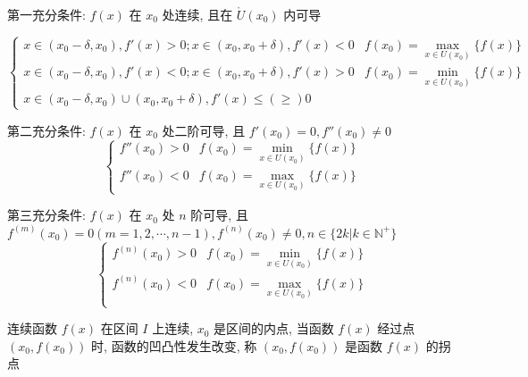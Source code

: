 \begin{theorem}[极值点判别]
	第一充分条件: $f(x)$ 在 $x_{0}$ 处连续, 且在 $\mathring{U}(x_{0})$ 内可导 

	$$\begin{cases} 
		x\in(x_{0}-\delta,x_{0}),f'(x) > 0; x\in(x_{0},x_{0}+\delta), f'(x) < 0 & f(x_{0}) = \max\limits_{x\in U(x_{0})}\{f(x)\}\\
		x\in(x_{0}-\delta,x_{0}),f'(x) < 0; x\in(x_{0},x_{0}+\delta), f'(x) > 0 & f(x_{0}) = \min\limits_{x\in U(x_{0})}\{f(x)\}\\
		x\in(x_{0}-\delta,x_{0})\cup(x_{0},x_{0}+\delta), f'(x)\leq (\geq) 0 
	\end{cases}$$

	第二充分条件: $f(x)$ 在 $x_{0}$ 处二阶可导, 且 $f'(x_{0}) = 0, f''(x_{0})\neq 0$
	$$
	\begin{cases} 
		f''(x_{0}) > 0 & f(x_{0}) = \min\limits_{x\in U(x_{0})}\{f(x)\}\\
		f''(x_{0}) < 0 & f(x_{0}) = \max\limits_{x\in U(x_{0})}\{f(x)\}
	\end{cases}
	$$

	第三充分条件: $f(x)$ 在 $x_{0}$ 处 $n$ 阶可导, 且 $f^{(m)}(x_{0}) = 0(m = 1,2,\cdots,n-1), f^{(n)}(x_{0}) \neq 0, n\in \{2k|k\in \mathbb{N}^{+}\}$
	$$
	\begin{cases} 
		f^{(n)}(x_{0}) > 0 & f(x_{0}) = \min\limits_{x\in U(x_{0})}\{f(x)\}\\
		f^{(n)}(x_{0}) < 0 & f(x_{0}) = \max\limits_{x\in U(x_{0})}\{f(x)\}\\
	\end{cases}
	$$
\end{theorem}

\begin{definition}[拐点]
	连续函数 $f(x)$ 在区间 $I$ 上连续, $x_{0}$ 是区间的内点, 当函数 $f(x)$ 经过点 $(x_{0},f(x_{0}))$ 时,
	函数的凹凸性发生改变, 称 $(x_{0},f(x_{0}))$ 是函数 $f(x)$ 的拐点
\end{definition}

